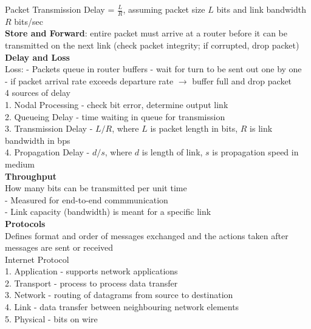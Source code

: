 \documentclass[10pt, a4paper]{article}
\newcommand{\highlight}[1]{{\color{red}\textbf{#1}}}
\newcommand{\blue}[1]{{\color{MidnightBlue}#1}}
\newcommand{\red}[1]{{\color{red}#1}}
\begin{document}
\begin{multicols*}{3}
		Packet Transmission Delay = $\frac{L}{R}$, assuming packet size $L$ bits and link bandwidth $R$ bits/sec\\
		
		\highlight{Store and Forward}: entire packet must arrive at a router before it can be transmitted on the next link (check packet integrity; if corrupted, drop packet)\\
		
		\textbf{Delay and Loss}\\
		Loss:
		- Packets queue in router buffers - wait for turn to be sent out one by one\\
		- if packet arrival rate exceeds departure rate $\rightarrow$ buffer full and drop packet\\

		4 sources of delay\\

		1. Nodal Processing - check bit error, determine output link\\
		2. Queueing Delay - time waiting in queue for transmission\\
		3. Transmission Delay - $L/R$, where $L$ is packet length in bits, $R$ is link bandwidth in bps\\
		4. Propagation Delay - $d/s$, where $d$ is length of link, $s$ is propagation speed in medium\\

		\textbf{Throughput}\\
		How many bits can be transmitted per unit time\\
		- Measured for \red{end-to-end} commmunication\\
		- \red{Link capacity (bandwidth)} is meant for a \red{specific link}\\

		\textbf{Protocols}\\
		Defines \blue{format} and \blue{order} of messages exchanged and the \blue{actions} taken after messages are sent or received\\

		Internet Protocol\\
		1. Application - supports network applications\\
		2. Transport - process to process data transfer\\
		3. Network - routing of datagrams from source to destination\\
		4. Link - data transfer between neighbouring network elements\\
		5. Physical - bits on wire\\


\end{multicols*}
\end{document}
